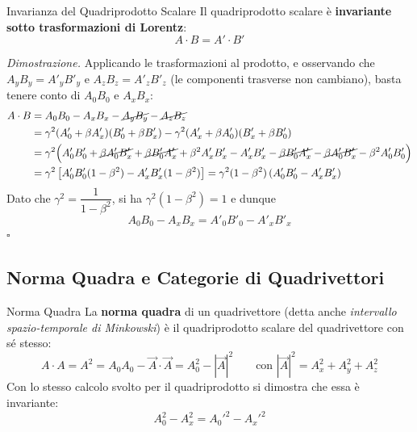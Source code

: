\begin{teorema}{Invarianza del Quadriprodotto Scalare}
Il quadriprodotto scalare è \textbf{invariante sotto trasformazioni di Lorentz}:
\begin{equation}
    A \cdot B = A' \cdot B'
\end{equation}
\end{teorema}

\emph{Dimostrazione.} Applicando le trasformazioni al prodotto, e osservando che $A_y B_y = A'_y B'_y$ e $A_z B_z = A'_z B'_z$ (le componenti trasverse non cambiano), basta tenere conto di $A_0 B_0$ e $A_x B_x$:
\begin{align*}
    A \cdot B &= A_0 B_0 - A_x B_x - \cancel{A_y B_y} - \cancel{A_z B_z} \\
    &= \gamma^2 (A'_0 + \beta A'_x)(B'_0 + \beta B'_x) - \gamma^2 (A'_x + \beta A'_0)(B'_x + \beta B'_0) \\
    &= \gamma^2 \Big( A'_0 B'_0 + \cancel{\beta A'_0 B'_x} + \cancel{\beta B'_0 A'_x} + \beta^2 A'_x B'_x
       - A'_x B'_x - \cancel{\beta B'_0 A'_x} - \cancel{\beta A'_0 B'_x} - \beta^2 A'_0 B'_0 \Big) \\
    &= \gamma^2 \left[ A'_0 B'_0 (1-\beta^2) - A'_x B'_x (1-\beta^2) \right]
     = \gamma^2 (1-\beta^2)\,(A'_0 B'_0 - A'_x B'_x)
\end{align*}
Dato che $\gamma^2 = \dfrac{1}{1-\beta^2}$, si ha $\gamma^2(1-\beta^2) = 1$ e dunque
\begin{equation}
    \boxed{\;A_0 B_0 - A_x B_x = A'_0 B'_0 - A'_x B'_x\;}
\end{equation}
$\square$

\subsection{Norma Quadra e Categorie di Quadrivettori}

\begin{definizione}{Norma Quadra}
La \textbf{norma quadra} di un quadrivettore (detta anche \emph{intervallo spazio-temporale di Minkowski}) è il quadriprodotto scalare del quadrivettore con sé stesso:
\begin{equation}
    A \cdot A = A^2 = A_0 A_0 - \vec{A} \cdot \vec{A} = A_0^2 - |\vec{A}|^2
    \qquad \text{con } |\vec{A}|^2 = A_x^2 + A_y^2 + A_z^2
\end{equation}
Con lo stesso calcolo svolto per il quadriprodotto si dimostra che essa è invariante:
\begin{equation}
    A_0^2 - A_x^2 = A_0'^2 - A_x'^2
\end{equation}
\end{definizione}

